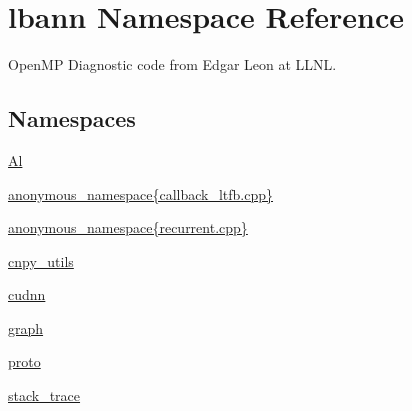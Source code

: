 \hypertarget{namespacelbann}{}\section{lbann Namespace Reference}
\label{namespacelbann}


Open\+MP Diagnostic code from Edgar Leon at L\+L\+NL.  


\subsection*{Namespaces}
\begin{DoxyCompactItemize}
\item 
 \hyperlink{namespacelbann_1_1Al}{Al}
\item 
 \hyperlink{namespacelbann_1_1anonymous__namespace_02callback__ltfb_8cpp_03}{anonymous\+\_\+namespace\{callback\+\_\+ltfb.\+cpp\}}
\item 
 \hyperlink{namespacelbann_1_1anonymous__namespace_02recurrent_8cpp_03}{anonymous\+\_\+namespace\{recurrent.\+cpp\}}
\item 
 \hyperlink{namespacelbann_1_1cnpy__utils}{cnpy\+\_\+utils}
\item 
 \hyperlink{namespacelbann_1_1cudnn}{cudnn}
\item 
 \hyperlink{namespacelbann_1_1graph}{graph}
\item 
 \hyperlink{namespacelbann_1_1proto}{proto}
\item 
 \hyperlink{namespacelbann_1_1stack__trace}{stack\+\_\+trace}
\end{DoxyCompactItemize}
